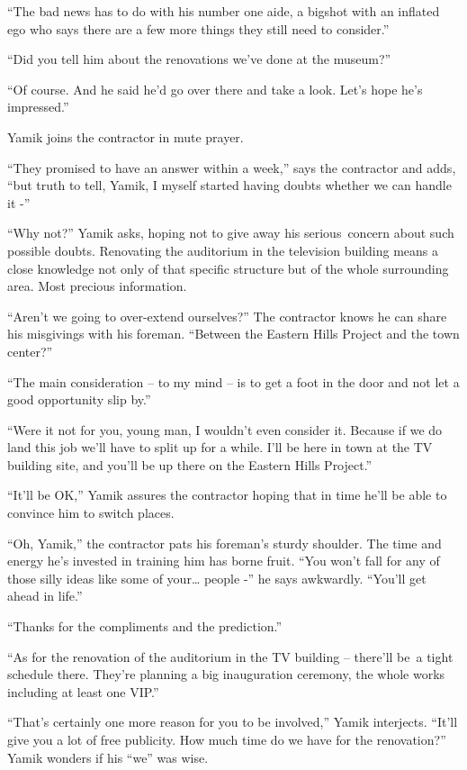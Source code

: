 \documentclass[twoside,11pt]{book}
\begin{document}
``The bad news has to do with his number one aide, a bigshot with an inflated ego who says there are a few
more things they still need to consider.'' 

``Did you tell him about the renovations we've done at the museum?'' 

``Of course. And he said he'd go over there and take a look. Let's hope he's impressed.'' 

Yamik joins the contractor in mute prayer. 

``They promised to have an answer within a week,'' says the contractor and adds,
``but truth to tell, Yamik, I myself started having doubts whether we can handle it -'' 

``Why not?'' Yamik asks, hoping not to give away his serious{\ }concern about
such possible doubts. Renovating the auditorium in the television building means a close knowledge not only of that
specific structure but of the whole surrounding area. Most precious information. ~

``Aren't we going to over-extend ourselves?'' The contractor knows he can share his misgivings
with his foreman. ``Between the Eastern Hills Project and the town center?'' 

``The main consideration -- to my mind -- is to get a foot in the door and not let a good opportunity slip
by.'' \ 

``Were it not for you, young man, I wouldn't even consider it. Because if we do land this job we'll have to
split up for a while. I'll be here in town at the TV building site, and you'll be up there on the Eastern Hills
Project.'' 

``It'll be OK,'' Yamik assures the contractor hoping that in time he'll be able to convince
him to switch places.\ ~

``Oh, Yamik,'' the contractor pats his foreman's sturdy shoulder. The time and energy he's
invested in training him has borne fruit. ``You won't fall for any of those silly ideas like some of
your{\dots} people -'' he says awkwardly. ``You'll get ahead in life.'' 

``Thanks for the compliments and the prediction.'' 

``As for the renovation of the auditorium in the TV building -- there'll be~a tight schedule there. They're
planning a big inauguration ceremony, the whole works including at least one VIP.'' 

``That's certainly one more reason for you to be involved,'' Yamik interjects.
``It'll give you a lot of free publicity. How much time do we have for the renovation?''
Yamik wonders if his ``we'' was wise.
\end{document}
